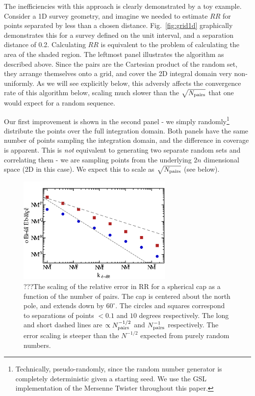 \documentclass[usenatbib]{mn2e}
\begin{document}
The inefficiencies with this approach is clearly demonstrated by a toy example.
Consider a 1D survey geometry, and imagine we
needed to estimate $RR$ for points separated by less than a chosen distance. 
Fig.~\ref{fig:grid1d} graphically demonstrates this for a survey defined on
the unit interval, and a separation distance of 0.2. Calculating $RR$ is
equivalent to the problem of calculating the area of the shaded region. The
leftmost panel illustrates the algorithm as described above. Since the pairs are
the Cartesian product of the random set, they arrange themselves onto a grid,
and cover the 2D integral domain very non-uniformly. As we will see explicitly
below, this adversly affects the convergence rate of this algorithm below,
scaling much slower than the $\sqrt{N_{\rm pairs}}$ that one would expect for a
random sequence. 

Our first improvement is shown in the second panel - we simply
randomly\footnote{Technically, pseudo-randomly, since the random number
generator is completely deterministic given a starting seed. We use the GSL
implementation of the Mersenne Twister throughout this paper.} distribute the
points over the full integration domain.
Both panels have the same number of points sampling the integration domain, and the difference in
coverage is apparent. This is {\it not} equivalent to generating two separate
random sets and correlating them - we are sampling points from the underlying $2n$ dimensional 
space (2D in this case). We expect this to scale as
$\sqrt{N_{\rm pairs}}$ (see below). 





\begin{figure}
\includegraphics[width=3in]{plots/cap2d}
\caption{???The scaling of the relative error in RR for a spherical cap as a function of the number
of pairs. The cap is centered about the north pole, and extends down by
$60^{\circ}$. The circles and squares correspond to separations of points $<
0.1$ and $10$ degrees respectively. The long and short dashed lines are
$\propto N_{\rm pairs}^{-1/2}$ and $N_{\rm pairs}^{-1}$ respectively. The error
scaling is steeper than the $N^{-1/2}$ expected from purely random numbers.}
\label{fig:cap2d}
\end{figure}
\end{document}
